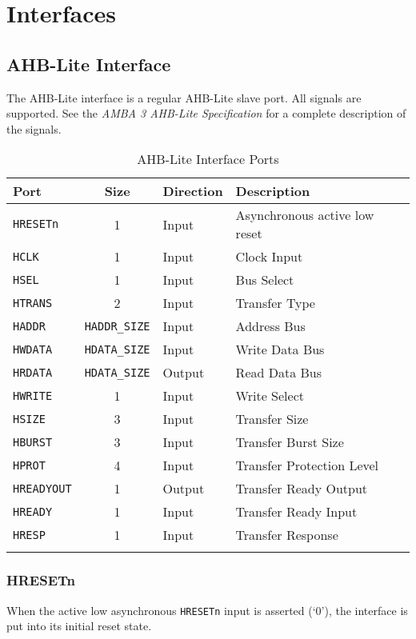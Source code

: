 \chapter{Interfaces}\label{interfaces}

\section{AHB-Lite Interface}\label{ahb-lite-interface}

The AHB-Lite interface is a regular AHB-Lite slave port. All signals are
supported. See the \emph{AMBA 3 AHB-Lite Specification} for a complete
description of the signals.

\begin{longtable}[]{@{}lcll@{}}
	\toprule
	Port      & Size        & Direction & Description\tabularnewline
	\midrule
	\endhead
		\texttt{HRESETn}   & 1                    & Input  & Asynchronous active low reset\tabularnewline
		\texttt{HCLK}      & 1                    & Input  & Clock Input\tabularnewline
		\texttt{HSEL}      & 1                    & Input  & Bus Select\tabularnewline
		\texttt{HTRANS}    & 2                    & Input  & Transfer Type\tabularnewline
		\texttt{HADDR}     & \texttt{HADDR\_SIZE} & Input  & Address Bus\tabularnewline
		\texttt{HWDATA}    & \texttt{HDATA\_SIZE} & Input  & Write Data Bus\tabularnewline
		\texttt{HRDATA}    & \texttt{HDATA\_SIZE} & Output & Read Data Bus\tabularnewline
		\texttt{HWRITE}    & 1                    & Input  & Write Select\tabularnewline
		\texttt{HSIZE}     & 3                    & Input  & Transfer Size\tabularnewline
		\texttt{HBURST}    & 3                    & Input  & Transfer Burst Size\tabularnewline
		\texttt{HPROT}     & 4                    & Input  & Transfer Protection Level\tabularnewline
		\texttt{HREADYOUT} & 1                    & Output & Transfer Ready Output\tabularnewline
		\texttt{HREADY}    & 1                    & Input  & Transfer Ready Input\tabularnewline
		\texttt{HRESP}     & 1                    & Input  & Transfer Response\tabularnewline
	\bottomrule
	\caption{AHB-Lite Interface	Ports}
\end{longtable}

\subsection{HRESETn}\label{hresetn}

When the active low asynchronous \texttt{HRESETn} input is asserted (`0'), the
interface is put into its initial reset state.

